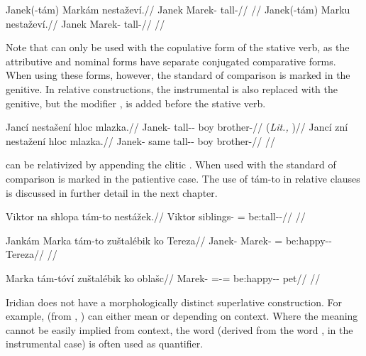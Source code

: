 \pex
\a\begingl
\gla Janek(-tám) Markám nestaževí.//
\glb Janek Marek-\Agt{} tall-\Cont{}//
\glft {}//
\endgl
\a\begingl
\gla Janek(-tám) Marku nestaževí.//
\glb Janek Marek-\Ins{} tall-\Cont{}//
\glft {}//
\endgl
\xe

Note that  can only be used with the copulative form of the stative
verb, as the attributive and nominal forms have separate
conjugated comparative forms. When using these forms, however, the standard of
comparison is marked in the genitive. In relative
constructions, the instrumental is also replaced with
the genitive, but the modifier ,  is
added before the stative verb.

\pex
\a
\begingl
\gla Jancí nestašení hloc mlazka.//
\glb Janek-\Gen{} tall-\Comp{}-\Att{} boy brother-\Dim{}//
\glft {} (\emph{Lit.,} )//
\endgl
\a
\begingl
\gla Jancí zní nestažení hloc mlazka.//
\glb Janek-\Gen{} same tall-\Comp{}-\Att{} boy brother-\Dim{}//
\glft {}//
\endgl
\xe

 can be relativized by appending the clitic .
When used with  the standard of comparison is marked in the
patientive case. The use of tám-to in relative clauses is
discussed in further detail in the next chapter.

\ex
\begingl
\gla Viktor na shlopa tám-to nestážek.//
\glb Viktor \Loc{} siblings-\Acc{} \Comp{}=\Rz{} be:tall-\Av{}-\Pf{}//
\glft {}//
\endgl
\xe

\ex
\begingl
\gla Jankám Marka tám-to zuštalébik ko Tereza//
\glb Janek-\Agt{} Marek-\Acc{} \Comp{}=\Rz{} be:happy-\Ben{}-\Pf{} \Lnk{} Tereza//
\glft {}//
\endgl
\xe

\ex
\begingl
\gla Marka tám-tóví zuštalébik ko oblašc//
\glb Marek-\Acc{} \Comp{}=\Rz{}-\Gen{}= be:happy-\Ben{}-\Pf{} \Lnk{} pet//
\glft {}//
\endgl
\xe

Iridian does not have a morphologically distinct superlative construction. For
example,  (from , ) can either mean
 or  depending on context. Where the meaning cannot
be easily implied from context, the word  (derived from the word
,  in the instrumental case) is often used as quantifier.

